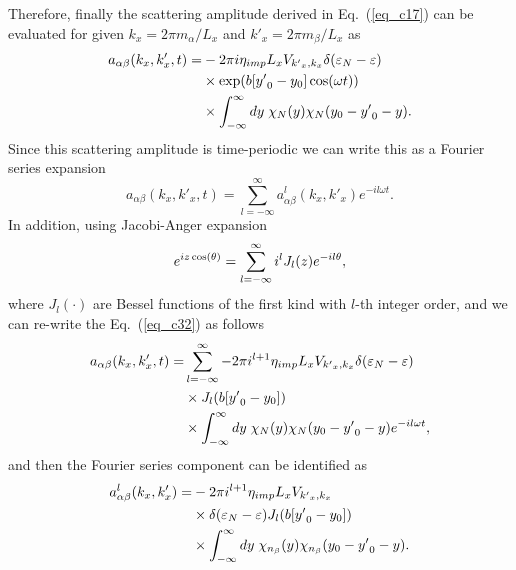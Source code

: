 Therefore, finally the scattering amplitude derived in Eq.~(\ref{eq_c17}) can be evaluated for given $k_x = 2\pi m_{\alpha}/L_x$ and $k'_x =  2\pi m_{\beta}/L_x$ as
\begin{equation} \label{eq_c32}
  \begin{aligned}
    a_{\alpha\beta}(k_x,k'_x,t)  =&
    -2\pi i
    \eta_{imp} L_x V_{{k'}_x,k_x}
    \delta(\varepsilon_{N} - \varepsilon)\\
    & \times
    \exp(b[{y'}_0 - y_0]\cos(\omega t))\\
    & \times
    \int_{-\infty}^{\infty} dy \;
    {\chi}_{N}\qty(y)
    {\chi}_{N}\qty(y_0 - {y'}_0 - y).
  \end{aligned}
\end{equation}
Since this scattering amplitude is time-periodic we can write this as a Fourier series expansion
\begin{equation} \label{eq_c33}
    a_{\alpha\beta}(k_x,k'_x,t) =
    \sum_{l=-\infty}^{\infty} a^l_{\alpha\beta}(k_x,k'_x) e^{-il\omega t}.
\end{equation}
In addition, using Jacobi-Anger expansion \cite{cuyt08,abramowitz64}
\begin{equation} \label{eq_c34}
    e^{iz\cos(\theta)} = \sum_{l=-\infty}^{\infty} i^l J_l\qty(z) e^{-il\theta},
\end{equation}
where $J_l(\cdot)$ are Bessel functions of the first kind with $l$-th integer order, and we can re-write the Eq.~(\ref{eq_c32}) as follows
\begin{equation} \label{eq_c35}
  \begin{aligned}
    a_{\alpha\beta}(k_x,k'_x,t)  = &
    \sum_{l=-\infty}^{\infty}
    -2\pi i^{l+1}
    \eta_{imp} L_x V_{{k'}_x,k_x}
    \delta(\varepsilon_{N} - \varepsilon)\\
    & \times
    J_l\qty(b[{y'}_0 - y_0]) \\
    & \times
    \int_{-\infty}^{\infty} dy \;
    {\chi}_{N}\qty(y)
    {\chi}_{N}\qty(y_0 - {y'}_0 - y) e^{-il\omega t},
  \end{aligned}
\end{equation}
and then the Fourier series component can be identified as
\begin{equation} \label{eq_c36}
  \begin{aligned}
    a^l_{\alpha\beta}(k_x,k'_x) = &
    -2\pi i^{l+1}
    \eta_{imp} L_x V_{{k'}_x,k_x}\\
    & \times
    \delta(\varepsilon_{N} - \varepsilon)
    J_l\qty(b[{y'}_0 - y_0])\\
    & \times
    \int_{-\infty}^{\infty} dy \;
    {\chi}_{n_{\beta}}\qty(y)
    {\chi}_{n_{\beta}}\qty(y_0 - {y'}_0 - y).
  \end{aligned}
\end{equation}
